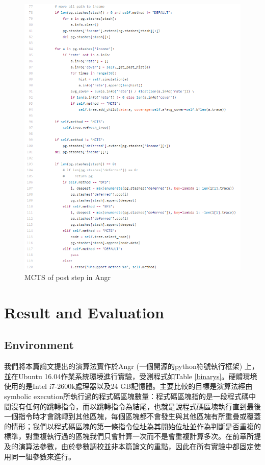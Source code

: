 \documentclass[12pt,a4paper,oneside]{book}
\begin{document}
\begin{figure}[htbp]
\center
\includegraphics[]{figures/postStep.png}
\caption{MCTS of post step in Angr \label{figPostStep}}
\end{figure}



\chapter{Result and Evaluation}

\section{Environment}

我們將本篇論文提出的演算法實作於Angr (一個開源的python符號執行框架) \cite{angr}上，並在Ubuntu 16.04作業系統環境進行實驗，受測程式如Table \ref{binarys}。硬體環境使用的是Intel i7-2600k處理器以及24 GB記憶體。主要比較的目標是演算法經由symbolic execution所執行過的程式碼區塊數量：程式碼區塊指的是一段程式碼中間沒有任何的跳轉指令，而以跳轉指令為結尾，也就是說程式碼區塊執行直到最後一個指令時才會跳轉到其他區塊，每個區塊都不會發生與其他區塊有所重疊或覆蓋的情形；我們以程式碼區塊的第一條指令位址為其開始位址並作為判斷是否重複的標準，對重複執行過的區塊我們只會計算一次而不是會重複計算多次。在前章所提及的演算法參數，由於參數調校並非本篇論文的重點，因此在所有實驗中都固定使用同一組參數來進行。
\end{document}
